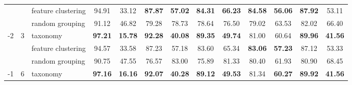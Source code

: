 \documentclass[final]{cvpr}
\begin{document}
\begin{table*}[t]
{\begin{tabular}{c|c|l|cc|cc|cc|cc|cc}
                                &                                                                                        & feature clustering                                                                                          & 94.91                & 33.12                 & \textbf{87.87}       & \textbf{57.02}        & \textbf{84.31}       & \textbf{66.23}        & \textbf{84.58}       & \textbf{56.06}        & \textbf{87.92}       & 53.11                \\
                                &                                                                                        & random grouping                                                                                             & 91.12                & 46.82                 & 79.28                & 78.73                 & 78.64                & 76.50                 & 79.02                & 63.53                 & 82.02                & 66.40                \\ \midrule
\multirow{3}{*}{-2}             & \multirow{3}{*}{3}                                                                     & taxonomy                                                                                                    & \textbf{97.21}       & \textbf{15.78}        & \textbf{92.28}       & \textbf{40.08}        & \textbf{89.35}       & \textbf{49.74}        & 81.00                & 60.64                 & \textbf{89.96}       & \textbf{41.56}       \\
                                &                                                                                        & feature clustering                                                                                          & 94.57                & 33.58                 & 87.23                & 57.18                 & 83.60                & 65.34                 & \textbf{83.06}       & \textbf{57.23}        & 87.12                & 53.33                \\
                                &                                                                                        & random grouping                                                                                             & 90.75                & 47.55                 & 76.57                & 83.00                 & 75.89                & 81.33                 & 80.40                & 61.93                 & 80.90                & 68.45                \\ \midrule
\multirow{3}{*}{-1}             & \multirow{3}{*}{6}                                                                     & taxonomy                                                                                                    & \textbf{97.16}       & \textbf{16.16}        & \textbf{92.07}       & \textbf{40.28}        & \textbf{89.12}       & \textbf{49.53}        & 81.34                & \textbf{60.27}        & \textbf{89.92}       & \textbf{41.56}       \\

\end{tabular}}
\end{table*}
\end{document}
